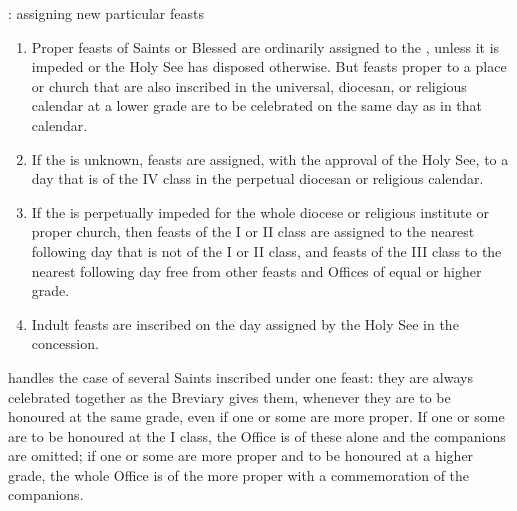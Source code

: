 \begin{studybox}{: assigning new particular feasts}
\begin{enumerate}[label=\alph*), leftmargin=1.6em, itemsep=0.2em]
\item Proper feasts of Saints or Blessed are ordinarily assigned to the ,
unless it is impeded or the Holy See has disposed otherwise. But feasts proper to a place or
church that are also inscribed in the universal, diocesan, or religious calendar at a lower
grade are to be celebrated on the same day as in that calendar.
\item If the  is unknown, feasts are assigned, with the approval of the
Holy See, to a day that is of the IV class in the perpetual diocesan or religious calendar.
\item If the  is perpetually impeded for the whole diocese or religious
institute or proper church, then feasts of the I or II class are assigned to the nearest
following day that is not of the I or II class, and feasts of the III class to the nearest
following day free from other feasts and Offices of equal or higher grade.
\item Indult feasts are inscribed on the day assigned by the Holy See in the concession.
\end{enumerate}
\end{studybox}

 handles the case of several Saints inscribed under one feast: they are always celebrated
together as the Breviary gives them, whenever they are to be honoured at the same grade, even if
one or some are more proper. If one or some are to be honoured at the I class, the Office is of
these alone and the companions are omitted; if one or some are more proper and to be honoured at
a higher grade, the whole Office is of the more proper with a commemoration of the companions.
